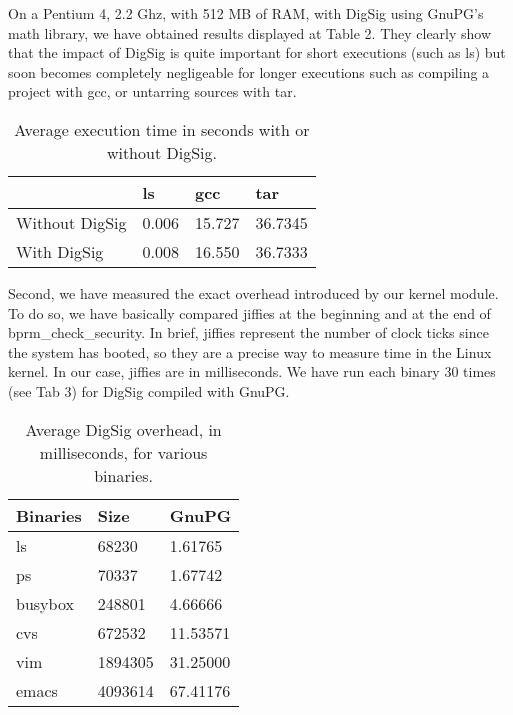 \documentclass{article}
\begin{document}
On a Pentium 4, 2.2 Ghz, with 512 MB of RAM, with DigSig using GnuPG's
math library, we have obtained results displayed at Table 2. They
clearly show that the impact of DigSig is quite important for short
executions (such as ls) but soon becomes completely negligeable for
longer executions such as compiling a project with gcc, or untarring
sources with tar.


\begin{table}[ht]
\begin{center}
\begin{tabular}{|l|l|l|l|}
\hline
 & ls & gcc   & tar    \\ 
\hline
Without DigSig & 0.006 & 15.727 & 36.7345 \\  
\hline
With DigSig    & 0.008 & 16.550 & 36.7333 \\
\hline
\end{tabular}
\caption{Average execution time in seconds with or without DigSig.}
\label{tab:userspace}
\end{center}
\end{table}



Second, we have measured the exact overhead introduced by our kernel
module. To do so, we have basically compared jiffies at the beginning
and at the end of bprm\_check\_security. In brief, jiffies represent
the number of clock ticks since the system has booted, so they
are a precise way to measure time in the Linux kernel. In our case,
jiffies are in milliseconds. We have run each binary 30 times
(see Tab 3) for DigSig compiled with GnuPG.

\begin{table}[ht]
\begin{center}
\begin{tabular}{|l|l|l|}
\hline
Binaries  & Size  &  GnuPG   \\
\hline 
ls &   68230 &  1.61765 \\ 
\hline 
ps &   70337 &  1.67742 \\
\hline 
busybox & 248801 &  4.66666 \\
\hline 
cvs &  672532 & 11.53571 \\
\hline 
vim & 1894305 & 31.25000 \\
\hline 
emacs & 4093614 & 67.41176 \\
\hline 
\end{tabular}
\caption{Average DigSig overhead, in milliseconds, for various 
binaries.}
\label{tab:userspace}
\end{center}
\end{table}
\end{document}
